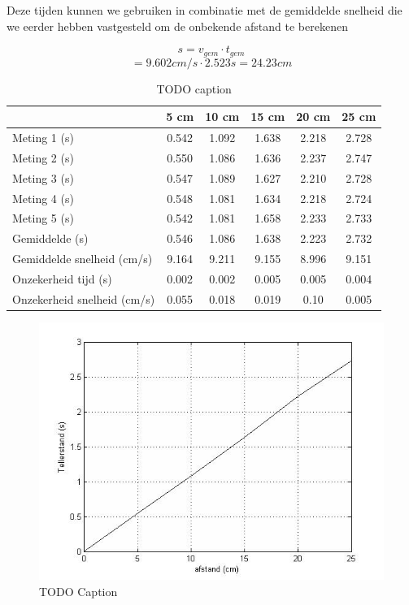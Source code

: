 \documentclass{report}
\begin{document}
Deze tijden kunnen we gebruiken in combinatie met de gemiddelde snelheid die we eerder hebben vastgesteld om de onbekende afstand te berekenen

$$ s = v_{gem} \cdot t_{gem}$$
$$ = 9.602 cm/s \cdot 2.523 s = 24.23 cm$$

\begin{table}
 \centering
\begin{tabular}{| l| c| c| c| c| c|}
\hline
   & 5 cm & 10 cm & 15 cm & 20 cm & 25 cm\\
\hline
   Meting 1 (s) & 0.542 & 1.092 & 1.638 & 2.218 & 2.728 \\
\hline
   Meting 2 (s) & 0.550 & 1.086 & 1.636 & 2.237 & 2.747 \\
\hline
   Meting 3 (s) & 0.547 & 1.089 & 1.627 & 2.210 & 2.728 \\
\hline
   Meting 4 (s) & 0.548 & 1.081 & 1.634 & 2.218 & 2.724 \\
\hline
   Meting 5 (s) & 0.542 & 1.081 & 1.658 & 2.233 & 2.733 \\
\hline
   Gemiddelde (s) & 0.546 & 1.086 & 1.638 & 2.223 & 2.732 \\
\hline
   Gemiddelde snelheid (cm/s) & 9.164 & 9.211 & 9.155 & 8.996 & 9.151 \\
\hline
   Onzekerheid tijd (s) & 0.002 & 0.002 & 0.005 & 0.005 & 0.004 \\
\hline
   Onzekerheid snelheid (cm/s) & 0.055 & 0.018 & 0.019 & 0.10 & 0.005 \\
\hline
 \end{tabular}
\caption{TODO caption}
\end{table}
\begin{figure}[H]
 \centering
\includegraphics[width=150mm] {afstand-tellerstand.jpg}
\caption{TODO Caption}
\end{figure}
\end{document}
